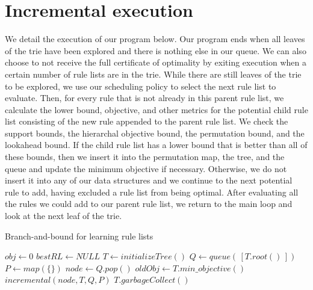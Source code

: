 \section{Incremental execution}
We detail the execution of our program below.
Our program ends when all leaves of the trie have been explored and there is nothing else in our queue.
We can also choose to not receive the full certificate of optimality by exiting execution when a certain number of rule lists are in the trie.
While there are still leaves of the trie to be explored, we use our scheduling policy to select the next rule list to evaluate.
Then, for every rule that is not already in this parent rule list, we calculate the lower bound, objective, and other metrics for the potential child rule list consisting of the new rule appended to the parent rule list.
We check the support bounds, the hierarchal objective bound, the permutation bound, and the lookahead bound.
If the child rule list has a lower bound that is better than all of these bounds, then we insert it into the permutation map, the tree, and the queue and update the minimum objective if necessary.
Otherwise, we do not insert it into any of our data structures and we continue to the next potential rule to add, having excluded a rule list from being optimal.
After evaluating all the rules we could add to our parent rule list, we return to the main loop and look at the next leaf of the trie.

\begin{algorithm}[t!]
  \caption{Branch-and-bound for learning rule lists}
\label{alg:branch-and-bound}
\begin{algorithmic}
\normalsize
\State $obj \gets 0$
\State $bestRL \gets NULL$
\State $T \gets initializeTree()$
\State $Q \gets queue(\,[T.root()\,])$
\State $P \gets map(\{\})$
	\State $node \gets Q.pop()$
	\State $oldObj \gets T.min\_objective()$
	\State $incremental(node, T, Q, P)$ 
		\State $T.garbageCollect()$
	\EndIf
\EndWhile


\end{algorithmic}
\end{algorithm}

